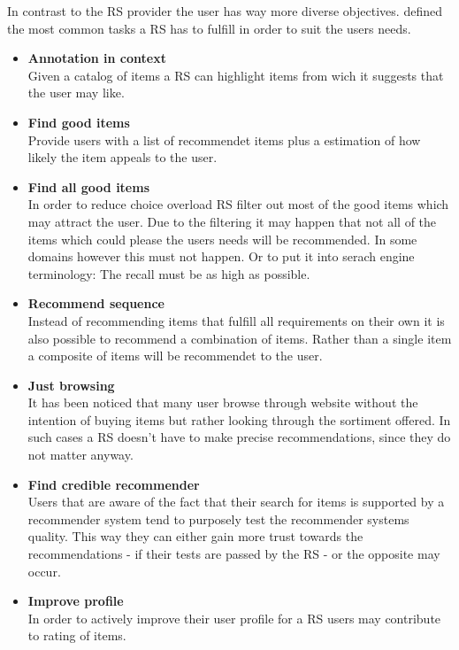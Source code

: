 In contrast to the RS provider the user has way more diverse objectives.
\citeauthor{herlocker:2004} defined the most common tasks a RS has to fulfill in order to suit the users needs.
\begin{itemize}
    \item\textbf{Annotation in context}\hfill\\
        Given a catalog of items a RS can highlight items from wich it suggests that the user may like.
    \item\textbf{Find good items}\hfill\\
        Provide users with a list of recommendet items plus a estimation of how likely the item appeals to the user.
    \item\textbf{Find all good items}\hfill\\
        In order to reduce choice overload RS filter out most of the good items which may attract the user.
        Due to the filtering it may happen that not all of the items which could please the users needs will be recommended.
        In some domains however this must not happen.
        Or to put it into serach engine terminology: The recall must be as high as possible.
    \item\textbf{Recommend sequence}\hfill\\
        Instead of recommending items that fulfill all requirements on their own it is also possible to recommend a combination of items.
        Rather than a single item a composite of items will be recommendet to the user.
    \item\textbf{Just browsing}\hfill\\
        It has been noticed that many user browse through website without the intention of buying items but rather looking through the sortiment offered.
        In such cases a RS doesn't have to make precise recommendations, since they do not matter anyway.
    \item\textbf{Find credible recommender}\hfill\\
        Users that are aware of the fact that their search for items is supported by a recommender system tend to purposely test the recommender systems quality.
        This way they can either gain more trust towards the recommendations - if their tests are passed by the RS - or the opposite may occur.
    \item\textbf{Improve profile}\hfill\\
        In order to actively improve their user profile for a RS users may contribute to rating of items.

\end{itemize}
